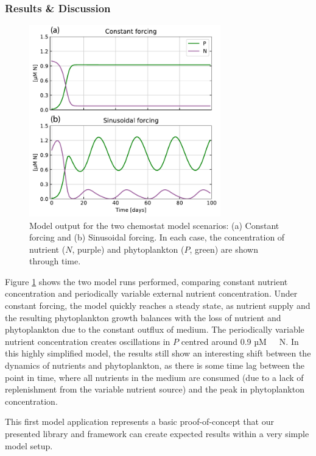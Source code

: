 \documentclass[journal abbreviation, manuscript]{copernicus}
\begin{document}
\subsubsection{Results \& Discussion}

\begin{figure}[t]
\includegraphics[width=8.3cm]{Figures/firstdraft_plots/01_chemostat_output.pdf}
\caption{Model output for the two chemostat model scenarios: (a) Constant forcing and (b) Sinusoidal forcing. In each case, the concentration of nutrient ($N$, purple) and phytoplankton ($P$, green) are shown through time.}
\label{Figure:ResultsChemostat}
\end{figure}

Figure \ref{Figure:ResultsChemostat} shows the two model runs performed, comparing constant nutrient concentration and periodically variable external nutrient concentration. Under constant forcing, the model quickly reaches a steady state, as nutrient supply and the resulting phytoplankton growth balances with the loss of nutrient and phytoplankton due to the constant outflux of medium. The periodically variable nutrient concentration creates oscillations in $P$ centred around 0.9 \unit{µM \ N}. In this highly simplified model, the results still show an interesting shift between the dynamics of nutrients and phytoplankton, as there is some time lag between the point in time, where all nutrients in the medium are consumed (due to a lack of replenishment from the variable nutrient source) and the peak in phytoplankton concentration.

This first model application represents a basic proof-of-concept that our presented library and framework can create expected results within a very simple model setup.
\end{document}
